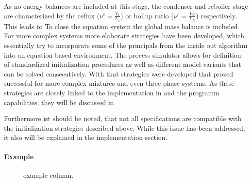        As no energy balances are included at this stage, the condenser and reboiler stage
        are characterized by the reflux ($\nu^c = \frac{V_1}{L_1}$) or boilup ratio
        ($\nu^r = \frac{V_N}{L_N}$) respectively. This leads to
        To close the equation system the global mass balance is included
        For more complex systems more elaborate strategies have been developed, which essentially try
        to incorporate some of the principals from the inside out algorithm into an equation based
        environment. The process simulator \gproms allows for definition of standardized initialization
        procedures as well as different model variants that can be solved consecutively. With that strategies
        were developed that proved successful for more complex mixtures and even three phase systems. As
        these strategies are closely linked to the implementation in \gproms and the programm
        capabilities, they will be discussed in 

        Furthermore ist should be noted, that not all specifications are compatible with the initialization
        strategies described above. While this issue has been addressed, it also will be explained in the
        implementation section.

        \paragraph{Example}

        \begin{figure}
            \begin{minipage}{0.25\textwidth}
                
                \caption{example column.}
                \label{fig:lpc_example}
            \end{minipage}
            \begin{minipage}{0.73\textwidth}
                \raisebox{\depth}{\footnotesize}
                \label{fig:lpc_example}
            \end{minipage}
        \end{figure}

